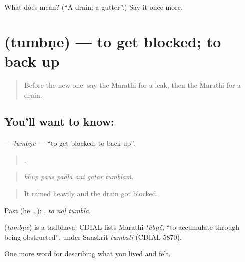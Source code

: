 \begin{tcolorbox}[breakable,colback=teal!4,colframe=teal!35!black,title={Before you move on}]
What does  mean? (\textquotedblleft{}A drain; a gutter\textquotedblright{}.) Say it once more.
\end{tcolorbox}
\section[\texorpdfstring{\mr{तुंबणे} (tumbṇe)}{तुंबणे (tumbṇe)}]{ (tumbṇe) — to get blocked; to back up}

\label{lesson:MR-C520-tumbne}



\begin{quote}
Before the new one: say the Marathi for a leak, then the Marathi for a drain.
\end{quote}

\subsection*{You'll want to know: }
\textbf{} — \emph{tumbṇe} — \textquotedblleft{}to get blocked; to back up\textquotedblright{}.

\begin{quote}
     .
\end{quote}

\begin{quote}
\emph{khūp pāūs paḍlā āṇi gaṭār tumblaṁ.}
\end{quote}

\begin{quote}
It rained heavily and the drain got blocked.
\end{quote}

Past (he …):   , \emph{to naḷ tumblā}.

\begin{cousinweb}
\textbf{} (\emph{tumbṇe}) is a tadbhava: CDIAL lists Marathi \emph{tũbṇẽ}, \textquotedblleft{}to accumulate through being obstructed\textquotedblright{}, under Sanskrit \emph{tumbati} (CDIAL 5870).
\end{cousinweb}

\begin{grammarlens}[title={What you've built}]
One more word for describing what you lived and felt.
\end{grammarlens}

